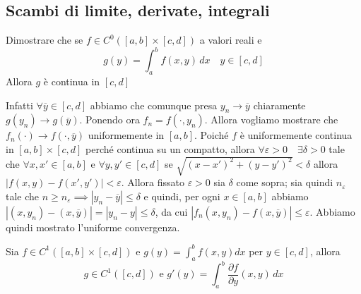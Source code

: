 \subsection{Scambi di limite, derivate, integrali}
\begin{example}
    Dimostrare che se \(f \in C^{0}([a, b] \times [c, d])\) a valori reali e 
    \[
        g(y) = \int_{a}^{b} f(x, y) \, dx \quad y \in [c, d]
    \]
    Allora \(g\) è continua in \([c,d]\) 

    Infatti \(\forall \overline{y} \in [c, d]\) abbiamo che comunque presa
    \(y_{n} \to \overline{y}\) chiaramente \(g(y_{n}) \to g(\overline{y})\).
    Ponendo ora \(f_{n} = f(\cdot , y_{n})\). Allora vogliamo mostrare che
    \(f_{n}(\cdot ) \to f(\cdot , \overline{y})\) uniformemente in \([a, b]\).
    Poiché \(f\) è uniformemente continua in \([a, b] \times [c, d]\) perché
    continua su un compatto, allora \(\forall \varepsilon > 0 \quad \exists
    \delta > 0\) tale che \(\forall x, x' \in [a, b]\) e \(\forall y, y' \in [c,
    d]\) se \(\sqrt{{(x - x')}^2 + {(y - y')}^2} < \delta\) allora \(|f(x, y) -
    f(x', y')| < \varepsilon\). Allora fissato \(\varepsilon>0\) sia \(\delta\)
    come sopra; sia quindi \(n_\varepsilon\) tale che \(n \ge n_\varepsilon
    \implies |y_{n} - \overline{y}| \le \delta\) e quindi, per ogni \(x \in [a,
    b]\) abbiamo \(|(x, y_{n}) - (x,
    \overline{y})| = |y_{n}-y| \le \delta\), da cui \(|f_{n}(x, y_{n}) - f(x,
    \overline{y})|\le \varepsilon\). Abbiamo quindi mostrato l'uniforme
    convergenza.
\end{example}
\begin{proposition}
    Sia \(f \in C^{1}([a,b] \times [c, d])\) e \(g(y) = \int_a^b f(x, y) dx\)
    per \(y \in [c, d]\), allora
    \[
        g \in C^{1}([c, d]) \text{ e } g'(y) = \int_a^b \frac{\partial
        f}{\partial y}(x, y) \, dx
    \]
\end{proposition}
